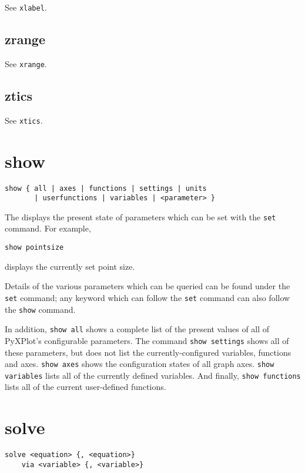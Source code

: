 See {\tt xlabel}.


\subsection{zrange}

See {\tt xrange}.


\subsection{ztics}

See {\tt xtics}.


\section{show}

\begin{verbatim}
show { all | axes | functions | settings | units
       | userfunctions | variables | <parameter> }
\end{verbatim}

The  displays the present state of parameters which can be set
with the {\tt set} command. For example,

\begin{verbatim}
show pointsize
\end{verbatim}

\noindent displays the currently set point size.

Details of the various parameters which can be queried can be found under the
{\tt set} command; any keyword which can follow the {\tt set} command can also
follow the {\tt show} command.

In addition, {\tt show all} shows a complete list of the present values of all
of PyXPlot's configurable parameters.  The command {\tt show settings} shows
all of these parameters, but does not list the currently-configured variables,
functions and axes. {\tt show axes} shows the configuration states of all graph
axes. {\tt show variables} lists all of the currently defined variables. And
finally, {\tt show functions} lists all of the current user-defined functions.


\section{solve}

\begin{verbatim}
solve <equation> {, <equation>}
    via <variable> {, <variable>}
\end{verbatim}

